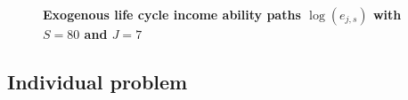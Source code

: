 \documentclass[letterpaper,12pt]{article}
\theoremstyle{definition}
\begin{document}
\begin{spacing}{1.5}
    \begin{figure}[htb]\centering \captionsetup{width=4.0in}
      \caption{\label{FigLogAbility}\textbf{Exogenous life cycle income ability paths $\log(e_{j,s})$ with $S=80$ and $J=7$}}
    \end{figure}


  \subsection{Individual problem}\label{SecIndProb}


\end{spacing}
\end{document}
